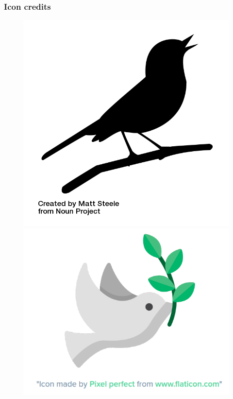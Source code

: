 \documentclass[10pt, aspectratio=1610]{beamer}
\begin{document}
\begin{frame}
  \frametitle{Icon credits}
  \begin{figure}
    \centering
    \hspace*{-0cm}\includegraphics[scale=0.15]{fig/logo-warbler2-cred.png}
    \hspace*{2cm}\includegraphics[scale=0.20]{fig/logo-bird-cred.png}
  \end{figure}
\end{frame}
\end{document}
